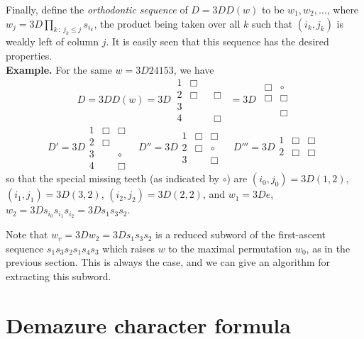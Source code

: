 Finally, define the {\em orthodontic sequence} of
$D =3D D(w)$ to be $w_1, w_2, \ldots$, where
$w_j =3D \prod_{k \, : \
j_k \leq j} s_{i_k}$, the product being taken
over all $k$ such that $(i_k,j_k)$ is weakly left of column $j$.
It is easily seen that this sequence
has the desired properties.
\\[1em]
{\bf Example.}
For the same
$ w =3D 24153$, we have
$$
D =3D D(w) =3D \
\begin{array}{cccc}
1 & \Box &      &      \\
2 & \Box &      & \Box \\
3 &      &      &      \\
4 &      &      & \Box
\end{array}
\ \
=3D
\ \
\begin{array}{cc}
\Box &  \circ \\
\Box &  \Box \\
     &       \\
     &  \Box
\end{array}
$$
$$
D' =3D
\begin{array}{ccc}
1 & \Box & \Box \\
2 & \Box &      \\
3 &      & \circ \\
4 &      & \Box
\end{array}
\ \ \ \
 D'' =3D
\begin{array}{ccc}
1 & \Box &  \Box \\
2 & \Box & \circ \\
3 &      &  \Box
\end{array} \
\ \ \ \
 D''' =3D
\begin{array}{ccc}
1 & \Box &  \Box \\
2 & \Box &  \Box \\
\end{array} \
$$
so that the special missing teeth (as indicated by $\circ$) are
$(i_0,j_0) =3D (1,2)$, $(i_1,j_1) =3D (3,2)$, $(i_2,j_2) =3D (2,2)$,
and $w_1 =3D e$, \, $w_2 =3D s_{i_0} s_{i_1} s_{i_2} =3D s_1 s_3 s_2$.

Note that $w_r =3D w_2 =3D s_1 s_3 s_2$ is a reduced subword
of the first-ascent sequence $s_1 s_3 s_2 s_1 s_4 s_3$
which raises $w$ to the maximal permutation $w_0$,
as in the previous section.  This is always the case,
and we can give an algorithm for extracting this subword.

\section{Demazure character formula}


